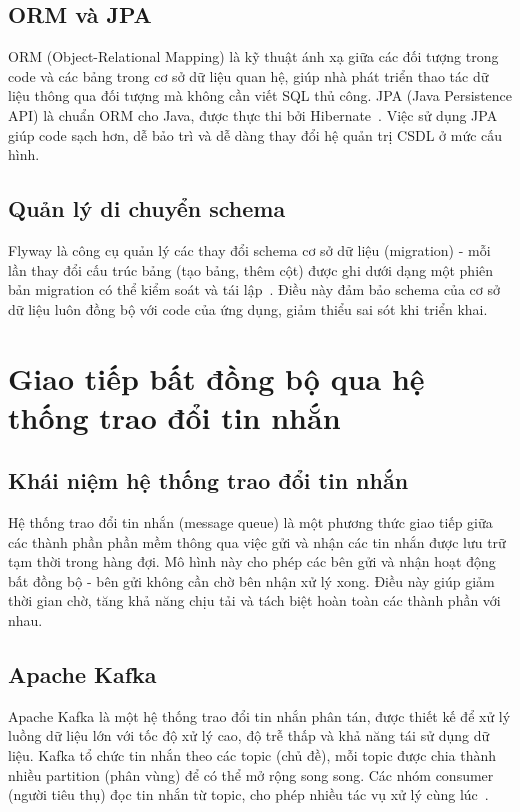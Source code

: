 \documentclass[../BTL.tex]{subfiles}
\begin{document}
\subsection{ORM và JPA}
\label{section:1.4.2}

ORM (Object-Relational Mapping) là kỹ thuật ánh xạ giữa các đối tượng trong code và các bảng trong cơ sở dữ liệu quan hệ, giúp nhà phát triển thao tác dữ liệu thông qua đối tượng mà không cần viết SQL thủ công. JPA (Java Persistence API) là chuẩn ORM cho Java, được thực thi bởi Hibernate~\cite{hibernatedocs}. Việc sử dụng JPA giúp code sạch hơn, dễ bảo trì và dễ dàng thay đổi hệ quản trị CSDL ở mức cấu hình.

\subsection{Quản lý di chuyển schema}
\label{section:1.4.3}

Flyway là công cụ quản lý các thay đổi schema cơ sở dữ liệu (migration) - mỗi lần thay đổi cấu trúc bảng (tạo bảng, thêm cột) được ghi dưới dạng một phiên bản migration có thể kiểm soát và tái lập~\cite{flywaydocs}. Điều này đảm bảo schema của cơ sở dữ liệu luôn đồng bộ với code của ứng dụng, giảm thiểu sai sót khi triển khai.

\section{Giao tiếp bất đồng bộ qua hệ thống trao đổi tin nhắn}
\label{section:1.5}

\subsection{Khái niệm hệ thống trao đổi tin nhắn}
\label{section:1.5.1}

Hệ thống trao đổi tin nhắn (message queue) là một phương thức giao tiếp giữa các thành phần phần mềm thông qua việc gửi và nhận các tin nhắn được lưu trữ tạm thời trong hàng đợi. Mô hình này cho phép các bên gửi và nhận hoạt động bất đồng bộ - bên gửi không cần chờ bên nhận xử lý xong. Điều này giúp giảm thời gian chờ, tăng khả năng chịu tải và tách biệt hoàn toàn các thành phần với nhau.

\subsection{Apache Kafka}
\label{section:1.5.2}

Apache Kafka là một hệ thống trao đổi tin nhắn phân tán, được thiết kế để xử lý luồng dữ liệu lớn với tốc độ xử lý cao, độ trễ thấp và khả năng tái sử dụng dữ liệu. Kafka tổ chức tin nhắn theo các topic (chủ đề), mỗi topic được chia thành nhiều partition (phân vùng) để có thể mở rộng song song. Các nhóm consumer (người tiêu thụ) đọc tin nhắn từ topic, cho phép nhiều tác vụ xử lý cùng lúc~\cite{kreps2011kafka,kafkadocs}.
\end{document}
